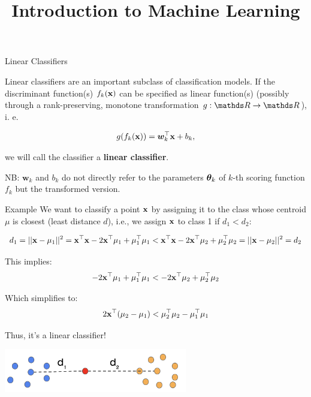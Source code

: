 \documentclass[11pt,compress,t,notes=noshow, xcolor=table]{beamer}
\title{Introduction to Machine Learning}
\begin{document}

\framebreak


\begin{vbframe}{Linear Classifiers}

Linear classifiers are an important subclass of classification models. 
If the discriminant function(s) $f_{k}(\mathbf{x})$ can be specified as linear function(s) (possibly through a rank-preserving,
monotone transformation $g: \R \to \R$), i. e. 

$$
  g(f_{k}(\mathbf{x})) = \bm{w}_k^\top \mathbf{x} + b_k,
$$

we will call the classifier a \textbf{linear classifier}. 

\vfill

NB: $\bm{w}_k$ and $b_k$ do not directly refer to the parameters $\bm{\theta}_k$ 
of $k$-th scoring function $f_k$ but the transformed version. 

\end{vbframe}

\begin{vbframe}{Example}
We want to classify a point $\mathbf{x}$ by assigning it to the class whose centroid $\mu$ is closest (least distance $d$), i.e., we assign $\mathbf{x}$ to class 1 if $d_1 < d_2$:

$$
d_1 = ||\mathbf{x} - \mathbf{\mu}_1||^2 = \mathbf{x}^\top \mathbf{x} - 2 \mathbf{x}^\top \mathbf{\mu}_1 + \mathbf{\mu}_1^\top \mathbf{\mu}_1
< \mathbf{x}^\top \mathbf{x} - 2 \mathbf{x}^\top \mathbf{\mu}_2 + \mathbf{\mu}_2^\top \mathbf{\mu}_2 = ||\mathbf{x} - \mathbf{\mu}_2||^2 = d_2
$$

This implies:
$$
-2 \mathbf{x}^\top \mathbf{\mu}_1 + \mathbf{\mu}_1^\top \mathbf{\mu}_1
< -2 \mathbf{x}^\top \mathbf{\mu}_2 + \mathbf{\mu}_2^\top \mathbf{\mu}_2
$$

Which simplifies to:
$$
2 \mathbf{x}^\top (\mathbf{\mu}_2 - \mathbf{\mu}_1) < \mathbf{\mu}_2^\top \mathbf{\mu}_2 - \mathbf{\mu}_1^\top \mathbf{\mu}_1
$$

Thus, it's a linear classifier!

\begin{center}
\includegraphics[width=0.6\textwidth]{figure_man/centroids.png} 
\end{center}

\end{vbframe}
  
\end{document}
